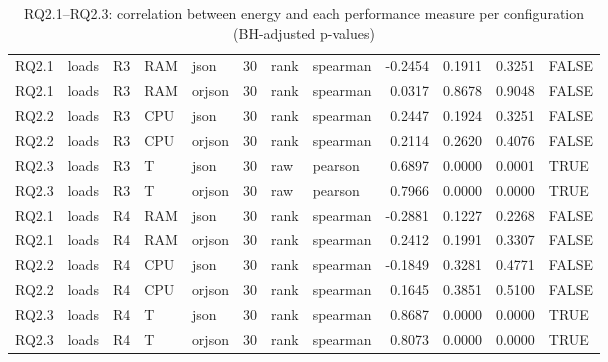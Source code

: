 \begin{table}[ht]
\begin{tabular}{lllllrllrrrl}
  RQ2.1 & loads & R3 & RAM & json &    30 & rank & spearman & -0.2454 & 0.1911 & 0.3251 & FALSE \\ 
  RQ2.1 & loads & R3 & RAM & orjson &    30 & rank & spearman & 0.0317 & 0.8678 & 0.9048 & FALSE \\ 
  RQ2.2 & loads & R3 & CPU & json &    30 & rank & spearman & 0.2447 & 0.1924 & 0.3251 & FALSE \\ 
  RQ2.2 & loads & R3 & CPU & orjson &    30 & rank & spearman & 0.2114 & 0.2620 & 0.4076 & FALSE \\ 
  RQ2.3 & loads & R3 & T & json &    30 & raw & pearson & 0.6897 & 0.0000 & 0.0001 & TRUE \\ 
  RQ2.3 & loads & R3 & T & orjson &    30 & raw & pearson & 0.7966 & 0.0000 & 0.0000 & TRUE \\ 
  RQ2.1 & loads & R4 & RAM & json &    30 & rank & spearman & -0.2881 & 0.1227 & 0.2268 & FALSE \\ 
  RQ2.1 & loads & R4 & RAM & orjson &    30 & rank & spearman & 0.2412 & 0.1991 & 0.3307 & FALSE \\ 
  RQ2.2 & loads & R4 & CPU & json &    30 & rank & spearman & -0.1849 & 0.3281 & 0.4771 & FALSE \\ 
  RQ2.2 & loads & R4 & CPU & orjson &    30 & rank & spearman & 0.1645 & 0.3851 & 0.5100 & FALSE \\ 
  RQ2.3 & loads & R4 & T & json &    30 & rank & spearman & 0.8687 & 0.0000 & 0.0000 & TRUE \\ 
  RQ2.3 & loads & R4 & T & orjson &    30 & rank & spearman & 0.8073 & 0.0000 & 0.0000 & TRUE \\ 
   \bottomrule
\end{tabular}
\caption{RQ2.1--RQ2.3: correlation between energy and each performance measure per configuration (BH-adjusted p-values)} 
\label{tab:rq2_correlations}
\end{table}
